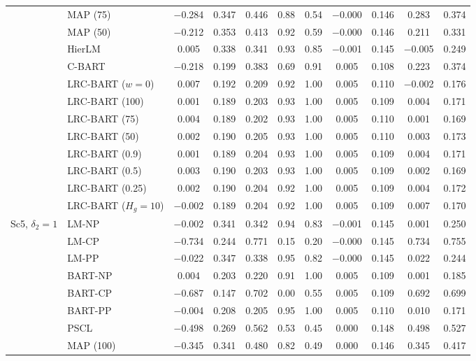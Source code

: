 \begin{center}
\begin{longtable}{llccccccccc}
& MAP (75) & $-$0.284 & 0.347 & 0.446 & 0.88 & 0.54 & $-$0.000 & 0.146 & 0.283 & 0.374 \\
& MAP (50) & $-$0.212 & 0.353 & 0.413 & 0.92 & 0.59 & $-$0.000 & 0.146 & 0.211 & 0.331 \\
& HierLM & 0.005 & 0.338 & 0.341 & 0.93 & 0.85 & $-$0.001 & 0.145 & $-$0.005 & 0.249 \\
& C-BART & $-$0.218 & 0.199 & 0.383 & 0.69 & 0.91 & 0.005 & 0.108 & 0.223 & 0.374 \\
& LRC-BART ($w=0$) & 0.007 & 0.192 & 0.209 & 0.92 & 1.00 & 0.005 & 0.110 & $-$0.002 & 0.176 \\
& LRC-BART (100) & 0.001 & 0.189 & 0.203 & 0.93 & 1.00 & 0.005 & 0.109 & 0.004 & 0.171 \\
& LRC-BART (75) & 0.004 & 0.189 & 0.202 & 0.93 & 1.00 & 0.005 & 0.110 & 0.001 & 0.169 \\
& LRC-BART (50) & 0.002 & 0.190 & 0.205 & 0.93 & 1.00 & 0.005 & 0.110 & 0.003 & 0.173 \\
& LRC-BART (0.9) & 0.001 & 0.189 & 0.204 & 0.93 & 1.00 & 0.005 & 0.109 & 0.004 & 0.171 \\
& LRC-BART (0.5) & 0.003 & 0.190 & 0.203 & 0.93 & 1.00 & 0.005 & 0.109 & 0.002 & 0.169 \\
& LRC-BART (0.25) & 0.002 & 0.190 & 0.204 & 0.92 & 1.00 & 0.005 & 0.109 & 0.004 & 0.172 \\
& LRC-BART ($H_g=10$) & $-$0.002 & 0.189 & 0.204 & 0.92 & 1.00 & 0.005 & 0.109 & 0.007 & 0.170 \\
\midrule
\multirow{20}{*}{Sc5, $\delta_2=1$} & LM-NP & $-$0.002 & 0.341 & 0.342 & 0.94 & 0.83 & $-$0.001 & 0.145 & 0.001 & 0.250 \\
& LM-CP & $-$0.734 & 0.244 & 0.771 & 0.15 & 0.20 & $-$0.000 & 0.145 & 0.734 & 0.755 \\
& LM-PP & $-$0.022 & 0.347 & 0.338 & 0.95 & 0.82 & $-$0.000 & 0.145 & 0.022 & 0.244 \\
& BART-NP & 0.004 & 0.203 & 0.220 & 0.91 & 1.00 & 0.005 & 0.109 & 0.001 & 0.185 \\
& BART-CP & $-$0.687 & 0.147 & 0.702 & 0.00 & 0.55 & 0.005 & 0.109 & 0.692 & 0.699 \\
& BART-PP & $-$0.004 & 0.208 & 0.205 & 0.95 & 1.00 & 0.005 & 0.110 & 0.010 & 0.171 \\
& PSCL & $-$0.498 & 0.269 & 0.562 & 0.53 & 0.45 & 0.000 & 0.148 & 0.498 & 0.527 \\
& MAP (100) & $-$0.345 & 0.341 & 0.480 & 0.82 & 0.49 & 0.000 & 0.146 & 0.345 & 0.417 \\

\end{longtable}
\end{center}
